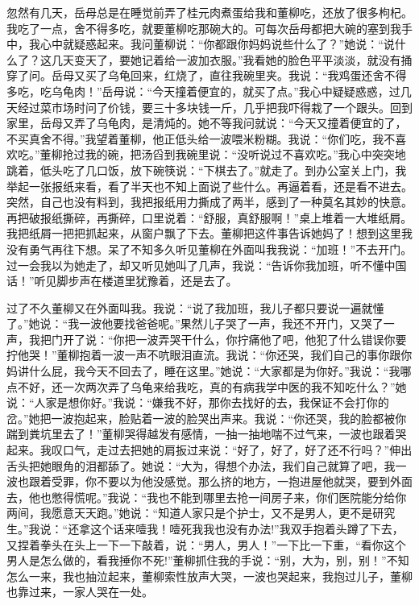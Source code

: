 \documentclass[12pt,oneside]{book}
\begin{document}
忽然有几天，岳母总是在睡觉前弄了桂元肉煮蛋给我和董柳吃，还放了很多枸杞。我吃了一点，舍不得多吃，就要董柳吃那碗大的。可每次岳母都把大碗的塞到我手中，我心中就疑惑起来。我问董柳说：``你都跟你妈妈说些什么了？''她说：``说什么了？这几天变天了，要她记着给一波加衣服。''我看她的脸色平平淡淡，就没有捅穿了问。岳母又买了乌龟回来，红烧了，直往我碗里夹。我说：``我鸡蛋还舍不得多吃，吃乌龟肉！''岳母说：``今天撞着便宜的，就买了点。''我心中疑疑惑惑，过几天经过菜市场时问了价钱，要三十多块钱一斤，几乎把我吓得栽了一个跟头。回到家里，岳母又弄了乌龟肉，是清炖的。她不等我问就说：``今天又撞着便宜的了，不买真舍不得。''我望着董柳，他正低头给一波喂米粉糊。我说：``你们吃，我不喜欢吃。''董柳抢过我的碗，把汤舀到我碗里说：``没听说过不喜欢吃。''我心中突突地跳着，低头吃了几口饭，放下碗筷说：``下棋去了。''就走了。到办公室关上门，我举起一张报纸来看，看了半天也不知上面说了些什么。再逼着看，还是看不进去。突然，自己也没有料到，我把报纸用力撕成了两半，感到了一种莫名其妙的快意。再把破报纸撕碎，再撕碎，口里说着：``舒服，真舒服啊！''桌上堆着一大堆纸屑。我把纸屑一把把抓起来，从窗户飘了下去。董柳把这件事告诉她妈了！想到这里我没有勇气再往下想。呆了不知多久听见董柳在外面叫我我说：``加班！''不去开门。过一会我以为她走了，却又听见她叫了几声，我说：``告诉你我加班，听不懂中国话！''听见脚步声在楼道里犹豫着，还是去了。

过了不久董柳又在外面叫我。我说：``说了我加班，我儿子都只要说一遍就懂了。''她说：``我一波他要找爸爸呢。''果然儿子哭了一声，我还不开门，又哭了一声，我把门开了说：``你把一波弄哭干什么，你拧痛他了吧，他犯了什么错误你要拧他哭！''董柳抱着一波一声不吭眼泪直流。我说：``你还哭，我们自己的事你跟你妈讲什么屁，我今天不回去了，睡在这里。''她说：``大家都是为你好。''我说：``我哪点不好，还一次两次弄了乌龟来给我吃，真的有病我学中医的我不知吃什么？''她说：``人家是想你好。''我说：``嫌我不好，那你去找好的去，我保证不会打你的岔。''她把一波抱起来，脸贴着一波的脸哭出声来。我说：``你还哭，我的脸都被你踹到粪坑里去了！''董柳哭得越发有感情，一抽一抽地喘不过气来，一波也跟着哭起来。我叹口气，走过去把她的肩扳过来说：``好了，好了，好了还不行吗？''伸出舌头把她眼角的泪都舔了。她说：``大为，得想个办法，我们自己就算了吧，我一波也跟着受罪，你不要以为他没感觉。那么挤的地方，一抱进屋他就哭，要到外面去，他也憋得慌呢。''我说：``我也不能到哪里去抢一间房子来，你们医院能分给你两间，我愿意天天跑。''她说：``知道人家只是个护士，又不是男人，更不是研究生。''我说：``还拿这个话来噎我！噎死我我也没有办法!''我双手抱着头蹲了下去，又捏着拳头在头上一下一下敲着，说：``男人，男人！''一下比一下重，``看你这个男人是怎么做的，看我捶你不死!''董柳抓住我的手说：``别，大为，别，别！''不知怎么一来，我也抽泣起来，董柳索性放声大哭，一波也哭起来，我抱过儿子，董柳也靠过来，一家人哭在一处。
\end{document}
